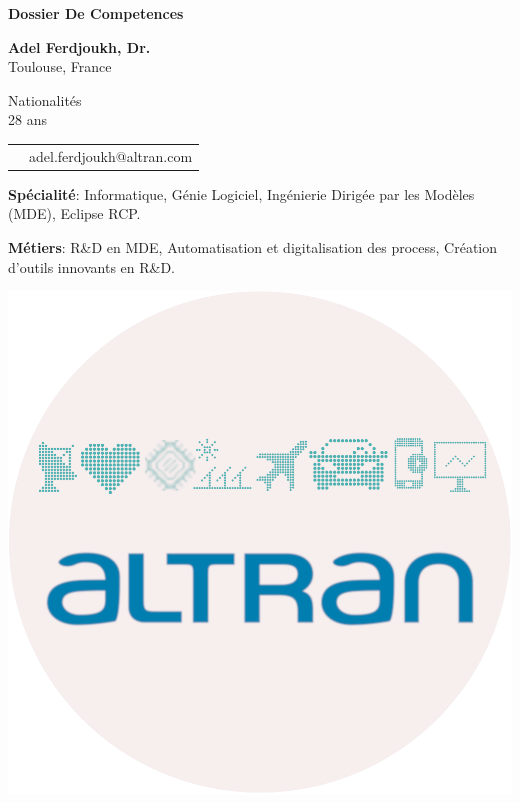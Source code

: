 \thispagestyle{empty}

\renewcommand\refname{~}

\begin{center}
\par\textbf{\huge \sc Dossier De Competences}
\end{center}

\vspace{.5cm}

\begin{minipage}{0.45\textwidth}
\textbf{Adel Ferdjoukh, Dr.} \\ 
Toulouse, France

\vspace{.3cm}

Nationalités \fr{} \dz{} \kab{} \\
28 ans \\

\begin{tabular}{cl}
\email{} & adel.ferdjoukh@altran.com\\
\end{tabular}

\medskip
{\bf Spécialité}: Informatique, Génie Logiciel, Ingénierie Dirigée par les Modèles (MDE), Eclipse RCP.

\medskip
{\bf Métiers}: R\&D en MDE, Automatisation et digitalisation des process, Création d’outils innovants en R\&D.


\end{minipage}
\hfill
\begin{minipage}{0.45\textwidth}
\begin{flushright}
\includegraphics[scale=0.8]{img/altran.png}~~~~~~~~
\end{flushright}
\end{minipage}



